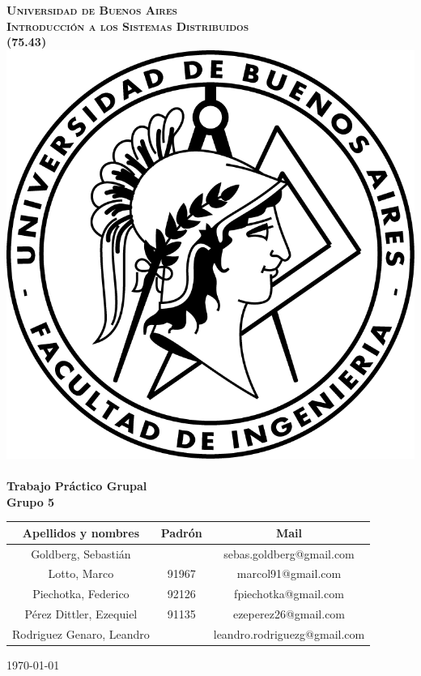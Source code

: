 \begin{titlepage}
\begin{center}


\textsc{\LARGE \textbf{Universidad de Buenos Aires}}\\%
\vfill
\textsc{\LARGE \textbf{Introducción a los Sistemas Distribuidos}}\\%
\vfill
\textsc{\LARGE \textbf{(75.43)}}\\%
\vfill
\vfill
\includegraphics[scale=1.25]{./logo.png}~\\[2cm]
{ \huge \bfseries Trabajo Práctico Grupal}\\%
\vfill
{ \huge \bfseries Grupo 5}\\%
\vfill
{\Large
\begin{tabular}{|c|c|c|}
\hline
Apellidos y nombres 		& Padrón	& 	Mail \\
\hline
Goldberg, Sebastián 			&  		& sebas.goldberg@gmail.com \\
\hline
Lotto, Marco 				& 91967 	& marcol91@gmail.com \\
\hline
Piechotka, Federico 			& 92126 	& fpiechotka@gmail.com \\
\hline
Pérez Dittler, Ezequiel 		& 91135 	& ezeperez26@gmail.com \\
\hline
Rodriguez Genaro, Leandro 	&  & leandro.rodriguezg@gmail.com \\
\hline
\end{tabular}
}
\vfill

{\large \today}

\end{center}
\end{titlepage}
